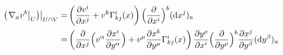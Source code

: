 \begin{align*}
    \left. \left(\left. \nabla_a v^b \right|_{U}\right) \right|_{U\cap V} = &
    \left(\frac{\partial v^i}{\partial x^j} +v^k \Gamma_{kj}^{i}(x) \right)
    \Bigl(\frac{\partial}{\partial x^i}\Bigr)^b ({\rm d}x^j)_a  \\
    =&  \left(\frac{\partial }{\partial x^j}\Bigl(v^\alpha \frac{\partial x^i}{\partial y^\alpha} \Bigr)
      + v^\mu \frac{\partial x^k}{\partial y^\mu} \Gamma_{kj}^{i}(x) \right)
      \frac{\partial y^\rho}{\partial x^i}  \Bigl(\frac{\partial}{\partial y^\rho}\Bigr)^b
      \frac{\partial x^j} {\partial y^\beta}    ({\rm d}y^\beta)_a  \\

\end{align*}
